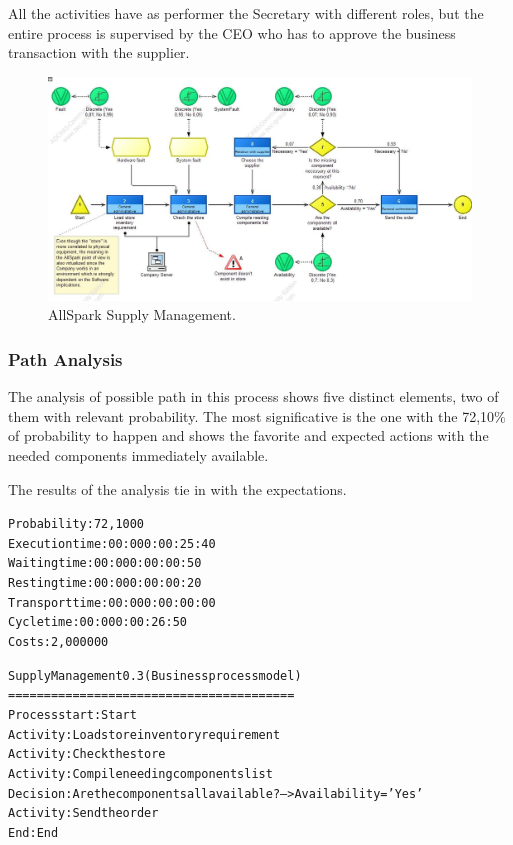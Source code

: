 All the activities have as performer the Secretary with different roles, but the entire process is supervised by the CEO who has to approve the business transaction with the supplier.

\begin{figure}[ht!]
\begin{centering}
\includegraphics[scale=0.50, angle=90]{assign2/adonis/imgs/supply_man.jpg}
\caption{AllSpark Supply Management.}
\label{2img:supply_man}
\end{centering}
\end{figure}


\subsubsection{Path Analysis}
The analysis of possible path in this process shows five distinct elements, two of them with relevant probability. The most significative is the one with the 72,10\% of probability to happen and shows the favorite and expected actions with the needed components immediately available.

The results of the analysis tie in with the expectations.

\begin{alltt}
Probability:   72,1000%
Execution time:  00:000:00:25:40
Waiting time:  00:000:00:00:50
Resting time:  00:000:00:00:20
Transport time:  00:000:00:00:00
Cycle time:  00:000:00:26:50
Costs:  2,000000

Supply Management 0.3 (Business process model)
========================================
Process start: Start
Activity: Load store inventory requirement
Activity: Check the store
Activity: Compile needing components list
Decision: Are the components all available? --> Availability = 'Yes'
Activity: Send the order
End: End
\end{alltt}


